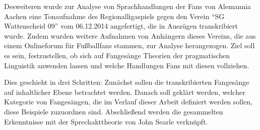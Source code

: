 Desweiteren wurde zur Analyse von Sprachhandlungen der Fans von Alemannia Aachen eine Tonaufnahme des Regionalligaspiels gegen den Verein "`SG Wattenscheid 09"' vom 06.12.2014 angefertigt, die in Auszügen transkribiert wurde.
Zudem wurden weitere Aufnahmen von Anhängern dieses Vereins, die aus einem Onlineforum für Fußballfans stammen, zur Analyse herangezogen.
Ziel soll es sein, festzustellen, ob sich auf Fangesänge Theorien der pragmatischen Linguistik anwenden lassen und welche Handlungen Fans mit diesen vollziehen.

Dies geschieht in drei Schritten:
Zunächst sollen die transkribierten Fangesänge auf inhaltlicher Ebene betrachtet werden.
Danach soll geklärt werden, welcher Kategorie von Fangesängen, die im Verlauf dieser Arbeit definiert werden sollen, diese Beispiele zuzuordnen sind.
Abschließend werden die gesammelten Erkenntnisse mit der Sprechakttheorie von John Searle verknüpft.